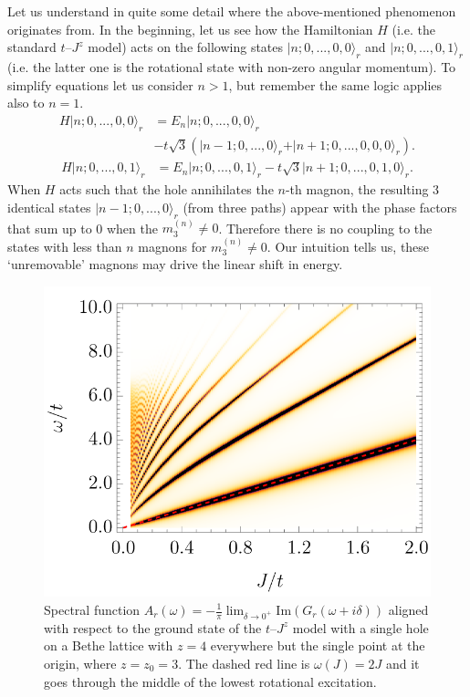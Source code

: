 \documentclass[10pt, a4paper, onecolumn]{article}
\newcommand{\ket}[1]{\vert #1 \rangle}
\begin{document}
Let us understand in quite some detail where the above-mentioned phenomenon originates from. In the beginning, let us see how the Hamiltonian $H$ (i.e. the standard $t$--$J^z$ model) acts on the following states $\ket{n;0,...,0,0}_r$ and $\ket{n;0,...,0,1}_r$ (i.e. the latter one is the rotational state with non-zero angular momentum). To simplify equations let us consider $n>1$, but remember the same logic applies also to $n = 1$.
\begin{equation}
\begin{aligned}
	H\ket{n;0,...,0,0}_r &= E_n \ket{n;0,...,0,0}_r \\
	&-t\sqrt{3}\left(\ket{n-1;0,...,0}_r + \ket{n+1;0,...,0,0,0}_r\right).
\end{aligned}
\end{equation}
\begin{equation}
\begin{aligned}
	H\ket{n;0,...,0,1}_r &= E_n \ket{n;0,...,0,1}_r -t\sqrt{3}\ket{n+1;0,...,0,1,0}_r.
\end{aligned}
\end{equation}
When $H$ acts such that the hole annihilates the $n$-th magnon, the resulting 3 identical states $\ket{n-1;0,...,0}_r$ (from three paths) appear with the phase factors that sum up to 0 when the $m^{(n)}_3 \neq 0$. Therefore there is no coupling to the states with less than $n$ magnons for $m^{(n)}_3 \neq 0$. Our intuition tells us, these `unremovable' magnons may drive the linear shift in energy.

\begin{figure}[h!]
	\includegraphics[width=0.73\columnwidth]
	{./figures/perfect_linear.png}
	\caption{
		Spectral function $A_r(\omega) = -\frac{1}{\pi}\lim_{\delta \to 0^+}\mathrm{Im}(G_r(\omega + i\delta))$ aligned with respect to the ground state of the $t$--$J^z$ model with a single hole on a Bethe lattice with $z = 4$ everywhere but the single point at the origin, where $z = z_0 = 3$. The dashed red line is $\omega(J) = 2J$ and it goes through the middle of the lowest rotational excitation.
	}\label{fig:perfect_linear}
\end{figure}
\end{document}
